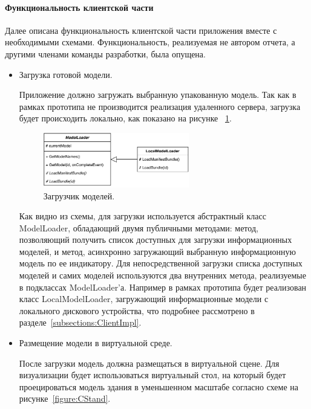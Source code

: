 ﻿\paragraph{Функциональность клиентской части}

Далее описана функциональность клиентской части приложения
вместе с необходимыми схемами.
Функциональность, реализуемая не автором отчета,
а другими членами команды разработки, была опущена.

\begin{itemize}
    \item {
        Загрузка готовой модели.

        Приложение должно загружать выбранную упакованную модель.
        Так как в рамках прототипа не производится реализация удаленного сервера,
        загрузка будет происходить локально, как показано на рисунке~%
        \ref{figure:CModelLoader}.

        \begin{figure}[ht]
            \centering
            \includegraphics[width=0.6\textwidth]{images/UML-CModelLoader.pdf}
            \caption{Загрузчик моделей.}
            \label{figure:CModelLoader}
        \end{figure}

        Как видно из схемы, для загрузки используется абстрактный класс ModelLoader,
        обладающий двумя публичными методами: метод, позволяющий получить список
        доступных для загрузки информационных моделей, и метод,
        асинхронно загружающий выбранную информационную модель по ее индикатору.
        Для непосредственной загрузки списка доступных моделей и самих моделей
        используются два внутренних метода, реализуемые в подклассах ModelLoader'а.
        Например в рамках прототипа будет реализован класс LocalModelLoader,
        загружающий информационные модели с локального дискового устройства,
        что подробнее рассмотрено в разделе~\ref{subsections:ClientImpl}.
    } 
    \item {
        Размещение модели в виртуальной среде.

        После загрузки модель должна размещаться в виртуальной сцене.
        Для визуализации будет использоваться виртуальный стол,
        на который будет проецироваться модель здания
        в уменьшенном масштабе согласно схеме на рисунке~\ref{figure:CStand}.

}
\end{itemize}
